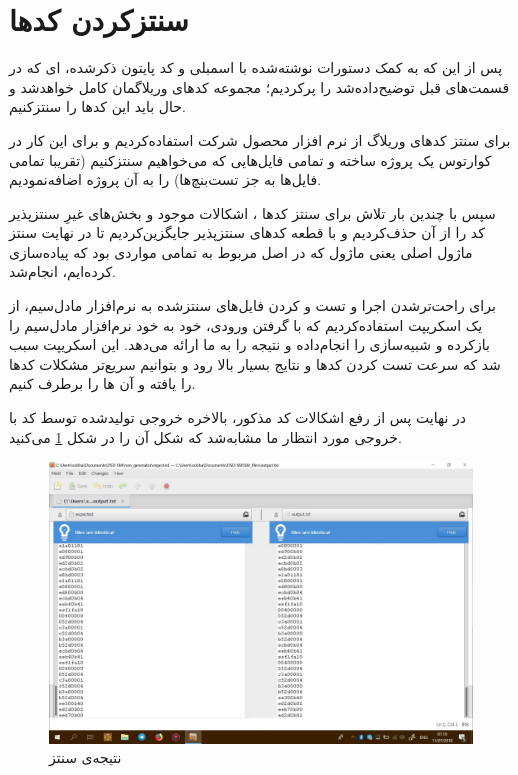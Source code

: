 \section*{سنتزکردن کدها}

پس از این که به کمک دستورات نوشته‌شده با اسمبلی 
 و کد پایتون ذکرشده، 
ای 
که در قسمت‌های قبل توضیح‌داده‌شد را پرکردیم؛ مجموعه کدهای وریلاگمان کامل خواهدشد و حال باید این کدها را سنتزکنیم.

برای سنتز کدهای وریلاگ از نرم افزار
 محصول شرکت
   استفاده‌کردیم و برای این کار در کوارتوس یک پروژه ساخته و تمامی فایل‌هایی که می‌خواهیم سنتزکنیم (تقریبا تمامی فایل‌ها به جز تست‌بنچ‌ها) را به آن پروژه اضافه‌نمودیم. 

سپس با چندین بار تلاش برای سنتز کدها ، اشکالات موجود و بخش‌های غیرِ سنتزپذیر کد را از آن حذف‌کردیم و با قطعه کدهای سنتزپذیر جایگزین‌کردیم تا در نهایت سنتز ماژول اصلی یعنی ماژول
 که در اصل مربوط به
  تمامی مواردی بود که پیاده‌سازی کرده‌ایم، انجام‌شد.

برای راحت‌ترشدن اجرا و تست و
کردن 
 فایل‌های سنتزشده به نرم‌افزار مادل‌سیم، از یک اسکریپت استفاده‌کردیم که با گرفتن ورودی، خود به خود نرم‌افزار مادل‌سیم را بازکرده و شبیه‌سازی را انجام‌داده و نتیجه را به ما ارائه می‌دهد. این اسکریپت سبب شد که سرعت تست کردن کدها و نتایج بسیار بالا رود و بتوانیم سریع‌تر مشکلات کدها را یافته و آن ها را برطرف کنیم.

در نهایت پس از رفع اشکالات کد مذکور، بالاخره خروجی تولیدشده توسط کد با خروجی مورد انتظار ما مشابه‌شد که شکل آن را در شکل
\ref{fig:result}
 می‌کنید.

\begin{figure}[H]
	\centering
	\includegraphics[width=0.8\linewidth]{result}
	\caption{نتیجه‌ی سنتز}
	\label{fig:result}
\end{figure}

